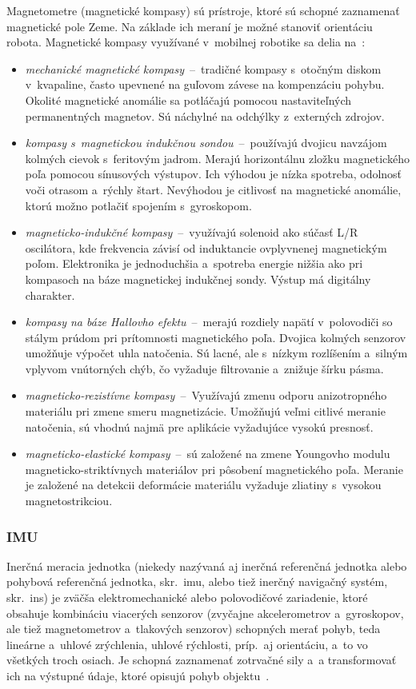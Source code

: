       Magnetometre (magnetické kompasy) sú prístroje, ktoré sú schopné zaznamenať magnetické pole Zeme. Na základe ich meraní je možné stanoviť orientáciu robota. Magnetické kompasy využívané v~mobilnej robotike sa delia na~\cite{duchonSnimaceMobilnejRobotike2012}:
      \begin{itemize}
        \item \emph{mechanické magnetické kompasy}~--~tradičné kompasy s~otočným diskom v~kvapaline, často upevnené na guľovom závese na kompenzáciu pohybu. Okolité magnetické anomálie sa potláčajú pomocou nastaviteľných permanentných magnetov. Sú náchylné na odchýlky z~externých zdrojov.
        \item \emph{kompasy s~magnetickou indukčnou sondou}~--~používajú dvojicu navzájom kolmých cievok s~feritovým jadrom. Merajú horizontálnu zložku magnetického poľa pomocou sínusových výstupov. Ich výhodou je nízka spotreba, odolnosť voči otrasom a~rýchly štart. Nevýhodou je citlivosť na magnetické anomálie, ktorú možno potlačiť spojením s~gyroskopom.
        \item \emph{magneticko-indukčné kompasy}~--~využívajú solenoid ako súčasť L/R oscilátora, kde frekvencia závisí od induktancie ovplyvnenej magnetickým poľom. Elektronika je jednoduchšia a~spotreba energie nižšia ako pri kompasoch na báze magnetickej indukčnej sondy. Výstup má digitálny charakter.
        \item \emph{kompasy na báze Hallovho efektu}~--~merajú rozdiely napätí v~polovodiči so stálym prúdom pri prítomnosti magnetického poľa. Dvojica kolmých senzorov umožňuje výpočet uhla natočenia. Sú lacné, ale s~nízkym rozlíšením a~silným vplyvom vnútorných chýb, čo vyžaduje filtrovanie a~znižuje šírku pásma.
        \item \emph{magneticko-rezistívne kompasy}~--~Využívajú zmenu odporu anizotropného materiálu pri zmene smeru magnetizácie. Umožňujú veľmi citlivé meranie natočenia, sú vhodnú najmä pre aplikácie vyžadujúce vysokú presnosť.
        \item \emph{magneticko-elastické kompasy}~--~sú založené na zmene Youngovho modulu magneticko-striktívnych materiálov pri pôsobení magnetického poľa. Meranie je založené na detekcii deformácie materiálu vyžaduje zliatiny s~vysokou magnetostrikciou.
      \end{itemize}

    \subsubsection{IMU}
      Inerčná meracia jednotka (niekedy nazývaná aj inerčná referenčná jednotka alebo pohybová referenčná jednotka, skr.\ \acrshort{imu}, alebo tiež inerčný navigačný systém, skr.\ \acrshort{ins}) je zväčša elektromechanické alebo polovodičové zariadenie, ktoré obsahuje kombináciu viacerých senzorov (zvyčajne akcelerometrov a~gyroskopov, ale tiež magnetometrov a~tlakových senzorov) schopných merať pohyb, teda lineárne a~uhlové zrýchlenia, uhlové rýchlosti, príp.\ aj orientáciu, a~to vo všetkých troch osiach. Je schopná zaznamenať zotrvačné sily a~a transformovať ich na výstupné údaje, ktoré opisujú pohyb objektu~\cite{InertialMeasurementUnit2023}.

